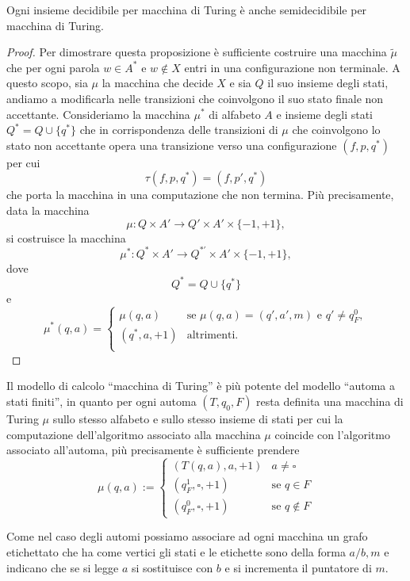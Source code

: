 \begin{prop}
Ogni insieme decidibile per macchina di Turing è anche semidecidibile per macchina di
Turing.
\begin{proof}
    Per dimostrare questa proposizione è suﬀiciente costruire una macchina 
$\tilde \mu$ che per ogni
parola $w\in A^*$ e $w \notin X$ entri in una configurazione non terminale.
A questo scopo, sia $\mu$ la macchina che decide $X$ e sia $Q$ il suo insieme degli stati, andiamo a modificarla
nelle transizioni che coinvolgono il suo stato finale non accettante.
Consideriamo la macchina $\mu^{*}$ di alfabeto $A$ e insieme degli stati
$Q^{*}=Q\cup\{q^{*}\}$ che in corrispondenza delle transizioni di $\mu$
che coinvolgono lo stato non accettante opera una transizione verso una
configurazione $(f,p,q^{*})$ per cui
\[
\tau(f,p,q^{*})=(f,p',q^{*})
\]
che porta la macchina in una computazione che non termina.
Più precisamente, data la macchina
\[
\mu : Q\times A' \longrightarrow Q' \times A' \times \{-1,+1\},
\]
si costruisce la macchina
\[
\mu^{*}:Q^{*}\times A'
\longrightarrow
Q^{*'}\times A'\times\{-1,+1\},
\]
dove
\[
Q^{*}=Q\cup\{q^{*}\}
\]
e
\[
\mu^{*}(q,a)=
\begin{cases}
\mu(q,a)
&
\text{se }\mu(q,a)=(q',a',m)
\text{ e }q'\neq q_{F}^{0},
\\[1ex]
(q^{*},a,+1)
&
\text{altrimenti.}
\\

\end{cases}
\]
\end{proof}
\end{prop}
\begin{rema} 
    
    Il modello di calcolo ``macchina di Turing'' è più potente del modello ``automa a stati finiti'', in quanto per ogni automa $(T, q_0, F)$ resta definita una macchina di Turing $\mu$ sullo stesso alfabeto e sullo stesso insieme di stati per cui la computazione dell'algoritmo associato alla macchina $\mu$ coincide con l'algoritmo associato all'automa, più precisamente è sufficiente prendere
\[
\mu(q,a) :=
\begin{cases}
(T(q,a), a, +1) & a \ne \square \\[4pt]
(q_F^1, \square, +1) & \text{se } q \in F \\[4pt]
(q_F^0, \square, +1) & \text{se } q \notin F
\end{cases}
\]
\end{rema}
\begin{rema}
    Come nel caso degli automi
    possiamo associare ad ogni macchina
    un grafo etichettato che 
    ha come vertici gli stati 
    e le etichette sono 
    della forma
    $a/b, m$ e indicano che
    se si legge $a$ si sostituisce con $b$
    e si incrementa il puntatore di $m$.
\end{rema}
